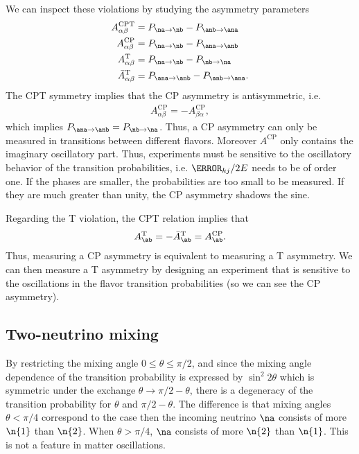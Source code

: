 \documentclass[twocolumn]{article}
\begin{document}
We can inspect these violations by studying the asymmetry parameters
\begin{align*}
  A^\text{CPT}_{\alpha \beta}     &= P_{\na \to \nb} - P_{\anb \to \ana} \\
  A^\text{CP}_{\alpha \beta}       &= P_{\na \to \nb} - P_{\ana \to \anb} \\
  A^\text{T}_{\alpha \beta}       &= P_{\na \to \nb} - P_{\nb \to \na}   \\
  \bar{A}^\text{T}_{\alpha \beta} &= P_{\ana \to \anb} - P_{\anb \to \ana}
.\end{align*}
The CPT symmetry implies that the CP asymmetry is antisymmetric, i.e.
\begin{align*}
  A^\text{CP}_{\alpha \beta} = - A^\text{CP}_{\beta \alpha}
,\end{align*}
which implies $P_{\ana \to \anb} = P_{\nb \to \na}$. Thus, a CP asymmetry can only be measured in transitions between different flavors. Moreover $A^\text{CP}$ only contains the imaginary oscillatory part. Thus, experiments must be sensitive to the oscillatory behavior of the transition probabilities, i.e. $\dm_{kj} / 2E$ needs to be of order one. If the phases are smaller, the probabilities are too small to be measured. If they are much greater than unity, the CP asymmetry shadows the sine.

Regarding the T violation, the CPT relation implies that 
\begin{align*}
  A^\text{T}_{\ab} = -\bar{A}^\text{T}_{\ab} = A^\text{CP}_{\ab}
.\end{align*}
Thus, measuring a CP asymmetry is equivalent to measuring a T asymmetry. We can then measure a T asymmetry by designing an experiment that is sensitive to the oscillations in the flavor transition probabilities (so we can see the CP asymmetry).

\subsection*{Two-neutrino mixing}
By restricting the mixing angle $0 \le \theta \le \pi / 2$, and since the mixing angle dependence of the transition probability is expressed by $\sin^2 2 \theta$ which is symmetric under the exchange $ \theta \to \pi / 2 - \theta $, there is a degeneracy of the transition probability for $\theta$ and $\pi / 2 - \theta$. The difference is that mixing angles $\theta < \pi / 4$ correspond to the case then the incoming neutrino $\na$ consists of more $\n{1}$ than $\n{2}$. When $\theta > \pi / 4$, $\na$ consists of more $\n{2}$ than $\n{1}$. This is not a feature in matter oscillations.
\end{document}

